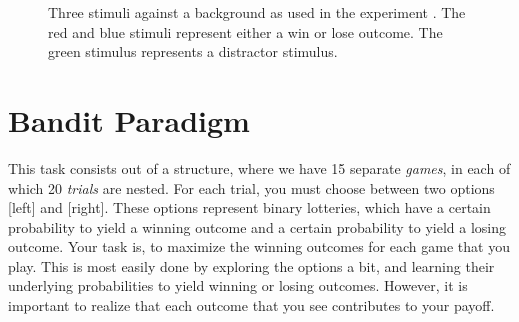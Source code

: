 \documentclass[12pt, oneside]{scrartcl}
\begin{document}
\pagebreak


\begin{figure}[h!]
\begin{center}

\captionsetup{width=.9\linewidth, format=plain}
\caption[Experimental Stimuli]{Three stimuli against a background as used in the experiment . The red and blue stimuli represent either a win or lose outcome. The green stimulus represents a distractor stimulus.}
\label{fig:stimuli}
\end{center}
\end{figure}





\pagebreak
\section{Bandit Paradigm}

This task consists out of a structure, where we have 15 separate \textit{games}, in each of which 20 \textit{trials} are nested. For each trial, you must choose between two options [left] and [right]. These options represent binary lotteries, which have a certain probability to yield a winning outcome and a certain probability to yield a losing outcome. Your task is, to maximize the winning outcomes for each game that you play. This is most easily done by exploring the options a bit, and learning their underlying probabilities to yield winning or losing outcomes. However, it is important to realize that each outcome that you see contributes to your payoff.  \vspace{\baselineskip}
\end{document}
